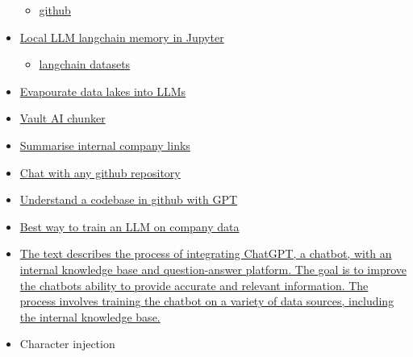 \begin{itemize}
  \begin{itemize}
   
  \item
    \href{https://github.com/booydar/t5-experiments}{github}
  \end{itemize}
\item
  \href{https://github.com/ausboss/Local-LLM-Langchain}{Local LLM
  langchain memory in Jupyter}

  \begin{itemize}
   
  \item
    \href{https://huggingface.co/LangChainDatasets}{langchain datasets}
  \end{itemize}
\item
  \href{https://github.com/HazyResearch/evaporate}{Evapourate data lakes
  into LLMs}
\item
  \href{https://github.com/pashpashpash/vault-ai}{Vault AI chunker}
\item
  \href{https://powerusers.microsoft.com/t5/Calling-Actions-from-PVA/Use-GPT-ChatGPT-to-summarize-and-reference-the-results-from-an/td-p/2101639}{Summarise
  internal company links}
\item
  \href{https://www.reddit.com/r/MachineLearning/comments/12oh07a/p_chat_with_any_github_repo_code_understanding/}{Chat
  with any github repository}
\item
  \href{https://useadrenaline.com/app}{Understand a codebase in github
  with GPT}
\item
  \href{https://www.reddit.com/r/MachineLearning/comments/125qztx/d_the_best_way_to_train_an_llm_on_company_data/}{Best
  way to train an LLM on company data}
\item
  \href{https://medium.com/singapore-gds/integrating-chatgpt-with-internal-knowledge-base-and-question-answer-platform-36a3283d6334}{The
  text describes the process of integrating ChatGPT, a chatbot, with an
  internal knowledge base and question-answer platform. The goal is to
  improve the chatbot\textquotesingle s ability to provide accurate and
  relevant information. The process involves training the chatbot on a
  variety of data sources, including the internal knowledge base.}
\item
  Character injection

  \begin{itemize}
   

\end{itemize}
\end{itemize}
